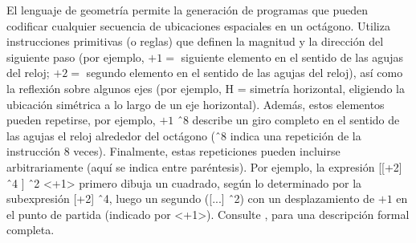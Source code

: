 
El lenguaje de geometría permite la generación de programas que pueden codificar cualquier secuencia de ubicaciones espaciales en un octágono. Utiliza instrucciones primitivas (o reglas) que definen la magnitud y la dirección del siguiente paso (por ejemplo, $+1 =$ siguiente elemento en el sentido de las agujas del reloj; $+2 =$ segundo elemento en el sentido de las agujas del reloj), así como la reflexión sobre algunos ejes (por ejemplo, H = simetría horizontal, eligiendo la ubicación simétrica a lo largo de un eje horizontal). Además, estos elementos pueden repetirse, por ejemplo, $+1$ \^ \ 8 describe un giro completo en el sentido de las agujas el reloj alrededor del octágono (\^ \ 8 indica una repetición de la instrucción 8 veces). Finalmente, estas repeticiones pueden incluirse arbitrariamente (aquí se indica entre paréntesis). Por ejemplo, la expresión [[+2] \^ \ 4 ] \^ \ 2 <+1> primero dibuja un cuadrado, según lo determinado por la subexpresión [+2] \^ \ 4, luego un segundo ([...] \^ \ 2) con un desplazamiento de $+1$ en el punto de partida (indicado por <+1>). Consulte \cite{amalric2017language}, para una descripción formal completa. 

